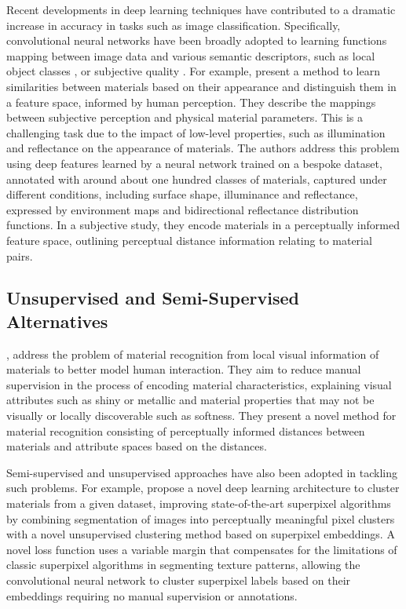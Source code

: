 Recent developments in deep learning techniques have contributed to a dramatic increase in accuracy in tasks such as image classification. Specifically, convolutional neural networks have been broadly adopted to learning functions mapping between image data and various semantic descriptors, such as local object classes \citep{long2015fully}, or subjective quality \citep{bosse2017deep}. For example, \cite{lagunas2019similarity} present a method to learn similarities between materials based on their appearance and distinguish them in a feature space, informed by human perception. They describe the mappings between subjective perception and physical material parameters. This is a challenging task due to the impact of low-level properties, such as illumination and reflectance on the appearance of materials. The authors address this problem using deep features learned by a neural network trained on a bespoke dataset, annotated with around about one hundred classes of materials, captured under different conditions, including surface shape, illuminance and reflectance, expressed by environment maps and bidirectional reflectance distribution functions. In a subjective study, they encode materials in a perceptually informed feature space, outlining perceptual distance information relating to material pairs.\par

\subsection{Unsupervised and Semi-Supervised Alternatives}
\cite{schwartz2019recognizing}, address the problem of material recognition from local visual information of materials to better model human interaction. They aim to reduce manual supervision in the process of encoding material characteristics, explaining visual attributes such as shiny or metallic and material properties that may not be visually or locally discoverable such as softness. They present a novel method for material recognition consisting of perceptually informed distances between materials and attribute spaces based on the distances.

Semi-supervised and unsupervised approaches have also been adopted in tackling such problems. For example, \cite{gaur2019superpixel} propose a novel deep learning architecture to cluster materials from a given dataset, improving state-of-the-art superpixel algorithms by combining segmentation of images into perceptually meaningful pixel clusters with a novel unsupervised clustering method based on superpixel embeddings. A novel loss function uses a variable margin that compensates for the limitations of classic superpixel algorithms in segmenting texture patterns, allowing the convolutional neural network to cluster superpixel labels based on their embeddings requiring no manual supervision or annotations.\par%

